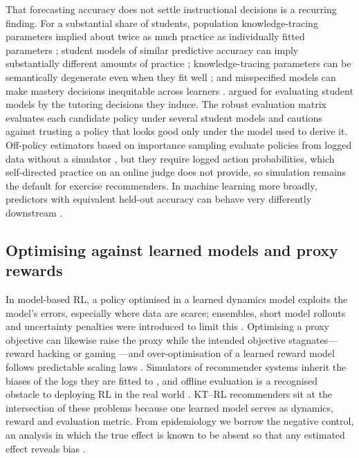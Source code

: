 That forecasting accuracy does not settle instructional decisions is a recurring finding. For a substantial share of students, population knowledge-tracing parameters implied about twice as much practice as individually fitted parameters \citep{lee2012individualizing}; student models of similar predictive accuracy can imply substantially different amounts of practice \citep{rollinson2015predictive}; knowledge-tracing parameters can be semantically degenerate even when they fit well \citep{doroudi2017identifiability}; and misspecified models can make mastery decisions inequitable across learners \citep{doroudi2019fairer}. \citet{gonzalezbrenes2015leopard} argued for evaluating student models by the tutoring decisions they induce. The robust evaluation matrix \citep{doroudi2017rem} evaluates each candidate policy under several student models and cautions against trusting a policy that looks good only under the model used to derive it. Off-policy estimators based on importance sampling evaluate policies from logged data without a simulator \citep{mandel2014offline,thomas2016dataefficient}, but they require logged action probabilities, which self-directed practice on an online judge does not provide, so simulation remains the default for exercise recommenders. In machine learning more broadly, predictors with equivalent held-out accuracy can behave very differently downstream \citep{breiman2001two,damour2022underspecification}.

\subsection{Optimising against learned models and proxy rewards}

In model-based RL, a policy optimised in a learned dynamics model exploits the model's errors, especially where data are scarce; ensembles, short model rollouts and uncertainty penalties were introduced to limit this \citep{kurutach2018metrpo,janner2019trust,yu2020mopo,moerland2023mbrl,levine2020offline}. Optimising a proxy objective can likewise raise the proxy while the intended objective stagnates---reward hacking or gaming \citep{amodei2016concrete,skalse2022reward}---and over-optimisation of a learned reward model follows predictable scaling laws \citep{gao2023scaling}. Simulators of recommender systems inherit the biases of the logs they are fitted to \citep{huang2020keeping}, and offline evaluation is a recognised obstacle to deploying RL in the real world \citep{dulacarnold2021challenges}. KT--RL recommenders sit at the intersection of these problems because one learned model serves as dynamics, reward and evaluation metric. From epidemiology we borrow the negative control, an analysis in which the true effect is known to be absent so that any estimated effect reveals bias \citep{lipsitch2010negative,arnold2016negative}.


